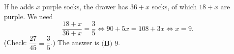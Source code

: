 If he adds $x$ purple socks, the drawer has $36+x$ socks, of which $18+x$ are purple. We need
\[\dfrac{18+x}{36+x}=\dfrac35\iff90+5x=108+3x\iff x=9.\]
(Check: $\dfrac{27}{45}=\dfrac35$.) The answer is $\boxed{\textbf{(B) }9}$.

